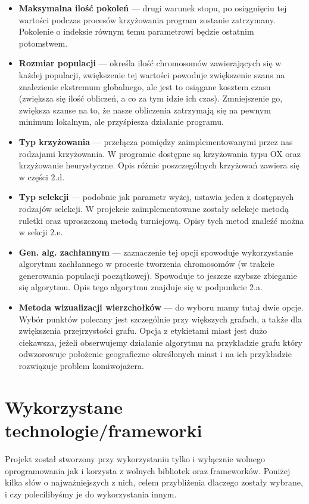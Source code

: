 \documentclass[a4paper]{article}
\begin{document}
\begin{itemize}
 \item \textbf{Maksymalna ilość pokoleń} --- drugi warunek stopu, po osiągnięciu tej wartości podczas procesów krzyżowania program zostanie zatrzymany. Pokolenie o indeksie równym temu parametrowi będzie ostatnim potomstwem.

 \item \textbf{Rozmiar populacji} --- określa ilość chromosomów zawierających się w każdej populacji, zwiększenie tej wartości powoduje zwiększenie szans na znalezienie ekstremum globalnego, ale jest to osiągane kosztem czasu (zwiększa się ilość obliczeń, a co za tym idzie ich czas). Zmniejszenie go, zwiększa szanse na to, że nasze obliczenia zatrzymają się na pewnym minimum lokalnym, ale przyśpiesza działanie programu.

 \item \textbf{Typ krzyżowania} --- przełącza pomiędzy zaimplementowanymi przez nas rodzajami krzyżowania. W programie dostępne są krzyżowania typu OX oraz krzyżowanie heurystyczne. Opis różnic poszczególnych krzyżowań zawiera się w części 2.d.

 \item \textbf{Typ selekcji} --- podobnie jak parametr wyżej, ustawia jeden z dostępnych rodzajów selekcji. W projekcie zaimplementowane zostały selekcje metodą ruletki oraz uproszczoną metodą turniejową. Opisy tych metod znaleźć można w sekcji 2.e.

 \item \textbf{Gen. alg. zachłannym} --- zaznaczenie tej opcji spowoduje wykorzystanie algorytmu zachłannego w procesie tworzenia chromosomów (w trakcie generowania populacji początkowej). Spowoduje to jeszcze szybsze zbieganie się algorytmu. Opis tego algorytmu znajduje się w podpunkcie 2.a.

 \item \textbf{Metoda wizualizacji wierzchołków} --- do wyboru mamy tutaj dwie opcje. Wybór punktów polecany jest szczególnie przy większych grafach, a także dla zwiększenia przejrzystości grafu. Opcja z etykietami miast jest dużo ciekawsza, jeżeli obserwujemy działanie algorytmu na przykładzie grafu który odwzorowuje położenie geograficzne określonych miast i na ich przykładzie rozwiązuje problem komiwojażera.
\end{itemize}


\section{Wykorzystane technologie/frameworki}
Projekt został stworzony przy wykorzystaniu tylko i wyłącznie wolnego oprogramowania jak i korzysta z wolnych bibliotek oraz frameworków. Poniżej kilka słów o najważniejszych z nich, celem przybliżenia dlaczego zostały wybrane, i czy polecilibyśmy je do wykorzystania innym.
\end{document}
